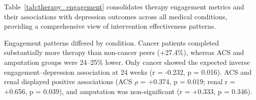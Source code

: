 \documentclass[conference]{IEEEtran}
\begin{document}
Table~\ref{tab:therapy_engagement} consolidates therapy engagement metrics and their associations with depression outcomes across all medical conditions, providing a comprehensive view of intervention effectiveness patterns.

\begin{table}[h]
\centering
\caption{Therapy Engagement and Depression Outcomes by Medical Condition. Comp. Rate = therapy completion rate; Engage. vs Non = completion rate difference compared to patients without the condition; r = Pearson correlation (Spearman for ACS 24W due to non-normality); Effect (Hi–Lo) = mean BDI-II difference between high engagement (>75\% completion) vs. low engagement (<50\%) groups at 24-week follow-up; * indicates statistically significant effects (p < 0.05).}
\label{tab:therapy_engagement}
\end{table}

Engagement patterns differed by condition. Cancer patients completed substantially more therapy than non-cancer peers (+27.4\%), whereas ACS and amputation groups were 24–25\% lower. Only cancer showed the expected inverse engagement–depression association at 24 weeks (r = -0.232, p = 0.016). ACS and renal displayed positive associations (ACS $\rho$ = +0.374, p = 0.019; renal r = +0.656, p = 0.039), and amputation was non-significant (r = +0.333, p = 0.346).
\end{document}
